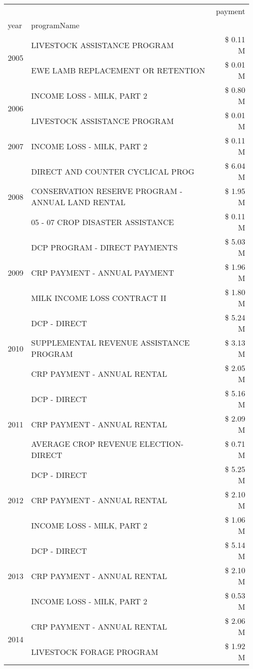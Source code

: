 \begin{tabular}{llr}
\toprule
 &  & payment \\
year & programName &  \\
\midrule
\multirow[t]{2}{*}{2005} & LIVESTOCK ASSISTANCE PROGRAM & \$ 0.11 M \\
 & EWE LAMB REPLACEMENT OR RETENTION & \$ 0.01 M \\
\cline{1-3}
\multirow[t]{2}{*}{2006} & INCOME LOSS - MILK, PART 2 & \$ 0.80 M \\
 & LIVESTOCK ASSISTANCE PROGRAM & \$ 0.01 M \\
\cline{1-3}
2007 & INCOME LOSS - MILK, PART 2 & \$ 0.11 M \\
\cline{1-3}
\multirow[t]{3}{*}{2008} & DIRECT AND COUNTER CYCLICAL PROG & \$ 6.04 M \\
 & CONSERVATION RESERVE PROGRAM - ANNUAL LAND RENTAL & \$ 1.95 M \\
 & 05 - 07 CROP DISASTER ASSISTANCE & \$ 0.11 M \\
\cline{1-3}
\multirow[t]{3}{*}{2009} & DCP PROGRAM - DIRECT PAYMENTS & \$ 5.03 M \\
 & CRP PAYMENT - ANNUAL PAYMENT & \$ 1.96 M \\
 & MILK INCOME LOSS CONTRACT II & \$ 1.80 M \\
\cline{1-3}
\multirow[t]{3}{*}{2010} & DCP - DIRECT & \$ 5.24 M \\
 & SUPPLEMENTAL REVENUE ASSISTANCE PROGRAM & \$ 3.13 M \\
 & CRP PAYMENT - ANNUAL RENTAL & \$ 2.05 M \\
\cline{1-3}
\multirow[t]{3}{*}{2011} & DCP - DIRECT & \$ 5.16 M \\
 & CRP PAYMENT - ANNUAL RENTAL & \$ 2.09 M \\
 & AVERAGE CROP REVENUE ELECTION-DIRECT & \$ 0.71 M \\
\cline{1-3}
\multirow[t]{3}{*}{2012} & DCP - DIRECT & \$ 5.25 M \\
 & CRP PAYMENT - ANNUAL RENTAL & \$ 2.10 M \\
 & INCOME LOSS - MILK, PART 2 & \$ 1.06 M \\
\cline{1-3}
\multirow[t]{3}{*}{2013} & DCP - DIRECT & \$ 5.14 M \\
 & CRP PAYMENT - ANNUAL RENTAL & \$ 2.10 M \\
 & INCOME LOSS - MILK, PART 2 & \$ 0.53 M \\
\cline{1-3}
\multirow[t]{3}{*}{2014} & CRP PAYMENT - ANNUAL RENTAL & \$ 2.06 M \\
 & LIVESTOCK FORAGE PROGRAM & \$ 1.92 M \\

\end{tabular}
